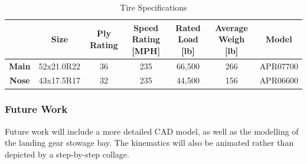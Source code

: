 \begin{table}[!h]
    \centering
        \caption{Tire Specifications}
    \begin{tabular}{|c||c|c|c|c|c|c|}\toprule
         & \textbf{Size} & \textbf{Ply Rating} & \textbf{Speed Rating [MPH]} & \textbf{Rated Load [lb]} & \textbf{Average Weigh [lb]} & \textbf{Model} \\\hline \hline
         \textbf{Main} & 52x21.0R22 & 36 & 235 & 66,500 & 266 & APR07700 \\ \hline
         \textbf{Nose} & 43x17.5R17 & 32 & 235 & 44,500 & 156 & APR06600 \\ \hline
    \end{tabular}
    \label{tab:tires}
\end{table}

\subsubsection{Future Work}
Future work will include a more detailed CAD model, as well as the modelling of the landing gear stowage bay. The kinematics will also be animated rather than depicted by a step-by-step collage.

